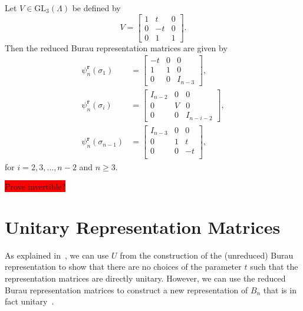 Let $V\in\textrm{GL}_{3}(\Lambda)$ be defined by
\begin{equation}
    V = \begin{bmatrix}
        1 & t & 0 \\
        0 & -t & 0 \\
        0 & 1 & 1
    \end{bmatrix}.
\end{equation}
Then the reduced Burau representation matrices are given by
\begin{align}
    \psi_n^\textbf{r}(\sigma_1) &= \begin{bmatrix}
        -t & 0 & 0 \\
        1 & 1 & 0 \\
        0 & 0 & I_{n-3}
    \end{bmatrix}, \\
    \psi_n^\textbf{r}(\sigma_i) &= \begin{bmatrix}
        I_{n-2} & 0 & 0 \\
        0 & V & 0 \\
        0 & 0 & I_{n-i-2}
    \end{bmatrix}, \\
    \psi_n^\textbf{r}(\sigma_{n-1}) &= \begin{bmatrix}
        I_{n-3} & 0 & 0 \\
        0 & 1 & t \\
        0 & 0 & -t \\
    \end{bmatrix},
\end{align}
for $i=2,3,\dots,n-2$ and $n\geq 3$.

\colorbox{red}{Prove invertible?}

\section{Unitary Representation Matrices}
As explained in~\cite{Delaney2016}, we can use $U$ from the construction of the (unreduced) Burau representation to show that there are no choices of the parameter $t$ such that the representation matrices are directly unitary. However, we can use the reduced Burau representation matrices to construct a new representation of $B_n$ that is in fact unitary~\cite{Delaney2016,Squier1984}.


